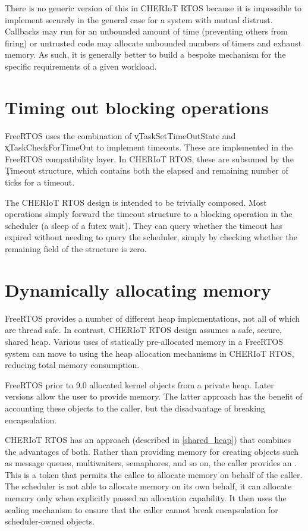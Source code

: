 There is no generic version of this in CHERIoT RTOS because it is impossible to implement securely in the general case for a system with mutual distrust.
Callbacks may run for an unbounded amount of time (preventing others from firing) or untrusted code may allocate unbounded numbers of timers and exhaust memory.
As such, it is generally better to build a bespoke mechanism for the specific requirements of a given workload.

\section{Timing out blocking operations}

FreeRTOS uses the combination of \c{vTaskSetTimeOutState} and \c{xTaskCheckForTimeOut} to implement timeouts.
These are implemented in the FreeRTOS compatibility layer.
In CHERIoT RTOS, these are subsumed by the \c{Timeout} structure, which contains both the elapsed and remaining number of ticks for a timeout.

The CHERIoT RTOS design is intended to be trivially composed.
Most operations simply forward the timeout structure to a blocking operation in the scheduler (a sleep of a futex wait).
They can query whether the timeout has expired without needing to query the scheduler, simply by checking whether the \c{remaining} field of the structure is zero.

\section{Dynamically allocating memory}

FreeRTOS provides a number of different heap implementations, not all of which are thread safe.
In contrast, CHERIoT RTOS design assumes a safe, secure, shared heap.
Various uses of statically pre-allocated memory in a FreeRTOS system can move to using the heap allocation mechanisms in CHERIoT RTOS, reducing total memory consumption.

FreeRTOS prior to 9.0 allocated kernel objects from a private heap.
Later versions allow the user to provide memory.
The latter approach has the benefit of accounting these objects to the caller, but the disadvantage of breaking encapsulation.

CHERIoT RTOS has an approach (described in \ref{shared_heap}) that combines the advantages of both.
Rather than providing memory for creating objects such as message queues, multiwaiters, semaphores, and so on, the caller provides an .
This is a token that permits the callee to allocate memory on behalf of the caller.
The scheduler is not able to allocate memory on its own behalf, it can allocate memory only when explicitly passed an allocation capability.
It then uses the sealing mechanism to ensure that the caller cannot break encapsulation for scheduler-owned objects.

